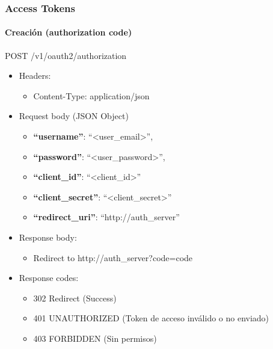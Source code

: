 \documentclass[12pt,a4paperpaper,]{report}
\providecommand{\tightlist}{%
  \setlength{\itemsep}{0pt}\setlength{\parskip}{0pt}}
\let\oldparagraph\paragraph
\renewcommand{\paragraph}[1]{\oldparagraph{#1}\mbox{}}
\begin{document}
\subsubsection{Access Tokens}\label{access-tokens}

\paragraph{Creación (authorization
code)}\label{creaciuxf3n-authorization-code}

POST /v1/oauth2/authorization

\begin{itemize}
\tightlist
\item
  Headers:

  \begin{itemize}
  \tightlist
  \item
    Content-Type: application/json
  \end{itemize}
\item
  Request body (JSON Object)

  \begin{itemize}
  \tightlist
  \item
    \textbf{``username''}: ``\textless{}user\_email\textgreater{}'',
  \item
    \textbf{``password''}: ``\textless{}user\_password\textgreater{}'',
  \item
    \textbf{``client\_id''}: ``\textless{}client\_id\textgreater{}''
  \item
    \textbf{``client\_secret''}:
    ``\textless{}client\_secret\textgreater{}''
  \item
    \textbf{``redirect\_uri''}: ``http://auth\_server''
  \end{itemize}
\item
  Response body:

  \begin{itemize}
  \tightlist
  \item
    Redirect to http://auth\_server?code=code
  \end{itemize}
\item
  Response codes:

  \begin{itemize}
  \tightlist
  \item
    302 Redirect (Success)
  \item
    401 UNAUTHORIZED (Token de acceso inválido o no enviado)
  \item
    403 FORBIDDEN (Sin permisos)
  \end{itemize}
\end{itemize}
\end{document}
